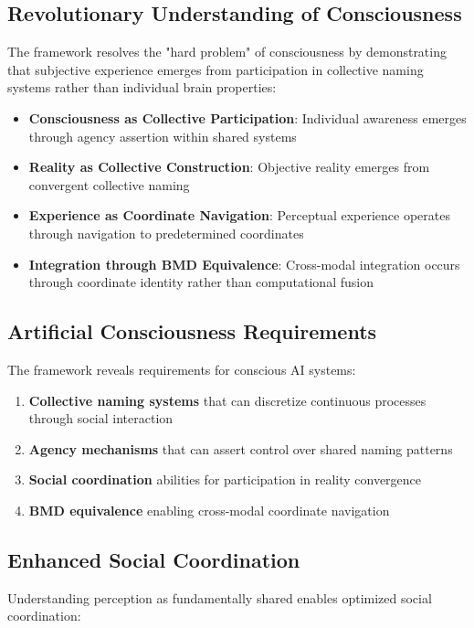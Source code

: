 \documentclass[12pt,a4paper]{article}
\begin{document}
\subsection{Revolutionary Understanding of Consciousness}

The framework resolves the "hard problem" of consciousness by demonstrating that subjective experience emerges from participation in collective naming systems rather than individual brain properties:

\begin{itemize}
\item \textbf{Consciousness as Collective Participation}: Individual awareness emerges through agency assertion within shared systems
\item \textbf{Reality as Collective Construction}: Objective reality emerges from convergent collective naming
\item \textbf{Experience as Coordinate Navigation}: Perceptual experience operates through navigation to predetermined coordinates
\item \textbf{Integration through BMD Equivalence}: Cross-modal integration occurs through coordinate identity rather than computational fusion
\end{itemize}

\subsection{Artificial Consciousness Requirements}

The framework reveals requirements for conscious AI systems:

\begin{enumerate}
\item \textbf{Collective naming systems} that can discretize continuous processes through social interaction
\item \textbf{Agency mechanisms} that can assert control over shared naming patterns
\item \textbf{Social coordination} abilities for participation in reality convergence
\item \textbf{BMD equivalence} enabling cross-modal coordinate navigation
\end{enumerate}

\subsection{Enhanced Social Coordination}

Understanding perception as fundamentally shared enables optimized social coordination:
\end{document}
